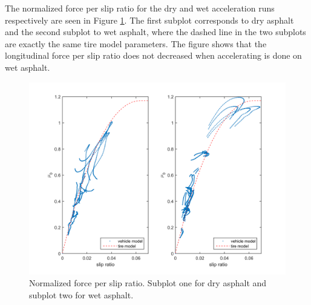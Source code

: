 The normalized force per slip ratio for the dry and wet acceleration runs respectively are seen in Figure \ref{slip_kraft_blot_och_torr}. The first subplot corresponds to dry asphalt and the second subplot to wet asphalt, where the dashed line in the two subplots are exactly the same tire model parameters. The figure shows that the longitudinal force per slip ratio does not decreased when accelerating is done on wet asphalt.

\begin{figure}[h]
	\centering
	\includegraphics[width=1.0\textwidth]{Pictures/slip_kraft_blot_och_torr}
	\caption {Normalized force per slip ratio. Subplot one for dry asphalt and subplot two for wet asphalt.}
	\label{slip_kraft_blot_och_torr}
\end{figure}